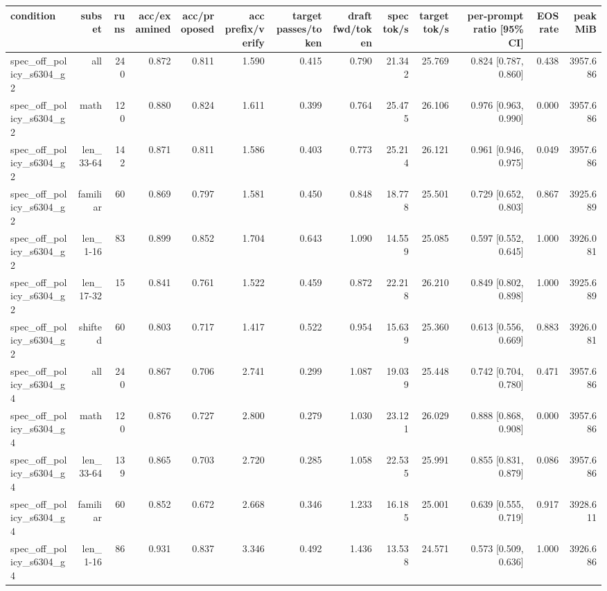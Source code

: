 \begin{tabular}{lrrrrrrrrrrrr}
\toprule
condition & subset & runs & acc/examined & acc/proposed & acc prefix/verify & target passes/token & draft fwd/token & spec tok/s & target tok/s & per-prompt ratio [95\% CI] & EOS rate & peak MiB \\
\midrule
spec\_off\_policy\_s6304\_g2 & all & 240 & 0.872 & 0.811 & 1.590 & 0.415 & 0.790 & 21.342 & 25.769 & 0.824 [0.787, 0.860] & 0.438 & 3957.686 \\
spec\_off\_policy\_s6304\_g2 & math & 120 & 0.880 & 0.824 & 1.611 & 0.399 & 0.764 & 25.475 & 26.106 & 0.976 [0.963, 0.990] & 0.000 & 3957.686 \\
spec\_off\_policy\_s6304\_g2 & len\_33-64 & 142 & 0.871 & 0.811 & 1.586 & 0.403 & 0.773 & 25.214 & 26.121 & 0.961 [0.946, 0.975] & 0.049 & 3957.686 \\
spec\_off\_policy\_s6304\_g2 & familiar & 60 & 0.869 & 0.797 & 1.581 & 0.450 & 0.848 & 18.778 & 25.501 & 0.729 [0.652, 0.803] & 0.867 & 3925.689 \\
spec\_off\_policy\_s6304\_g2 & len\_1-16 & 83 & 0.899 & 0.852 & 1.704 & 0.643 & 1.090 & 14.559 & 25.085 & 0.597 [0.552, 0.645] & 1.000 & 3926.081 \\
spec\_off\_policy\_s6304\_g2 & len\_17-32 & 15 & 0.841 & 0.761 & 1.522 & 0.459 & 0.872 & 22.218 & 26.210 & 0.849 [0.802, 0.898] & 1.000 & 3925.689 \\
spec\_off\_policy\_s6304\_g2 & shifted & 60 & 0.803 & 0.717 & 1.417 & 0.522 & 0.954 & 15.639 & 25.360 & 0.613 [0.556, 0.669] & 0.883 & 3926.081 \\
spec\_off\_policy\_s6304\_g4 & all & 240 & 0.867 & 0.706 & 2.741 & 0.299 & 1.087 & 19.039 & 25.448 & 0.742 [0.704, 0.780] & 0.471 & 3957.686 \\
spec\_off\_policy\_s6304\_g4 & math & 120 & 0.876 & 0.727 & 2.800 & 0.279 & 1.030 & 23.121 & 26.029 & 0.888 [0.868, 0.908] & 0.000 & 3957.686 \\
spec\_off\_policy\_s6304\_g4 & len\_33-64 & 139 & 0.865 & 0.703 & 2.720 & 0.285 & 1.058 & 22.535 & 25.991 & 0.855 [0.831, 0.879] & 0.086 & 3957.686 \\
spec\_off\_policy\_s6304\_g4 & familiar & 60 & 0.852 & 0.672 & 2.668 & 0.346 & 1.233 & 16.185 & 25.001 & 0.639 [0.555, 0.719] & 0.917 & 3928.611 \\
spec\_off\_policy\_s6304\_g4 & len\_1-16 & 86 & 0.931 & 0.837 & 3.346 & 0.492 & 1.436 & 13.538 & 24.571 & 0.573 [0.509, 0.636] & 1.000 & 3926.686 \\

\end{tabular}
